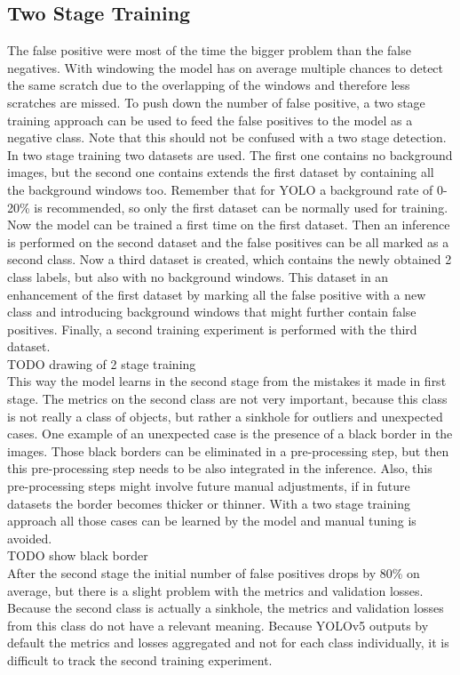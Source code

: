 \subsection{Two Stage Training}
The false positive were most of the time the bigger problem than the false negatives. With windowing the model has on average multiple chances to detect the same scratch due to the overlapping of the windows and therefore less scratches are missed. To push down the number of false positive, a two stage training approach can be used to feed the false positives to the model as a negative class. Note that this should not be confused with a two stage detection. \\
In two stage training two datasets are used. The first one contains no background images, but the second one contains extends the first dataset by containing all the background windows too. Remember that for YOLO a background rate of 0-20\% is recommended, so only the first dataset can be normally used for training. Now the model can be trained a first time on the first dataset. Then an inference is performed on the second dataset and the false positives can be all marked as a second class. Now a third dataset is created, which contains the newly obtained 2 class labels, but also with no background windows. This dataset in an enhancement of the first dataset by marking all the false positive with a new class and introducing background windows that might further contain false positives. Finally, a second training experiment is performed with the third dataset. \\
TODO drawing of 2 stage training \\
This way the model learns in the second stage from the mistakes it made in first stage. The metrics on the second class are not very important, because this class is not really a class of objects, but rather a sinkhole for outliers and unexpected cases. One example of an unexpected case is the presence of a black border in the images. Those black borders can be eliminated in a pre-processing step, but then this pre-processing step needs to be also integrated in the inference. Also, this pre-processing steps might involve future manual adjustments, if in future datasets the border becomes thicker or thinner. With a two stage training approach all those cases can be learned by the model and manual tuning is avoided.\\
TODO show black border \\
After the second stage the initial number of false positives drops by 80\% on average, but there is a slight problem with the metrics and validation losses. Because the second class is actually a sinkhole, the metrics and validation losses from this class do not have a relevant meaning. Because YOLOv5 outputs by default the metrics and losses aggregated and not for each class individually, it is difficult to track the second training experiment. \\

